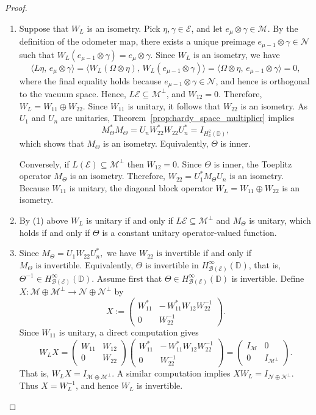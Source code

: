 \documentclass[12pt]{amsart}
\theoremstyle{definition}
\theoremstyle{remark}
\def \D{\mathbb{D}}
\newcommand{\clb}{\mathcal{B}}
\newcommand{\cle}{\mathcal{E}}
\newcommand{\clm}{\mathcal{M}}
\newcommand{\cln}{\mathcal{N}}
\numberwithin{equation}{section}
\begin{document}
\begin{proof}
\begin{enumerate}
        \item 
Suppose that $W_L$ is an isometry. Pick $\eta, \gamma \in \cle$, and let $e_\mu \otimes \gamma \in \clm$. By the definition of the odometer map, there exists a unique preimage $e_{\mu-1} \otimes  \gamma \in \cln$ such that $W_L( e_{\mu-1} \otimes  \gamma)=e_\mu \otimes \gamma$.
Since $W_L$ is an isometry, we have
\[
\langle L\eta,\, e_\mu \otimes \gamma \rangle
=
\langle W_L(\Omega \otimes \eta),\, W_L( e_{\mu-1} \otimes  \gamma) \rangle
= \langle \Omega \otimes \eta,\, e_{\mu-1} \otimes  \gamma \rangle = 0,
\]
where the final equality holds because $e_{\mu-1}\otimes\gamma \in \cln$, and hence is orthogonal to the vacuum space. Hence, $L\cle \subseteq \clm^\perp$, and $W_{12} = 0$. Therefore, $W_L = W_{11} \oplus W_{22}$. Since $W_{11}$ is unitary, it follows that $W_{22}$ is an isometry. As $U_1$ and $U_n$ are unitaries, Theorem~\ref{prop:hardy_space_multiplier} implies
\[
M_{\Theta}^*M_{\Theta}
=
U_n W_{22}^* W_{22} U_n^*
=
I_{H^2_\cle(\D)},
\]
which shows that $M_{\Theta}$ is an isometry. Equivalently, $\Theta$ is inner.

Conversely, if $L(\cle)\subseteq \clm^\perp$ then $W_{12}=0.$ Since $\Theta$ is inner, the Toeplitz operator $M_\Theta$ is an isometry. Therefore, $W_{22}=U_1^*M_\Theta U_n$ is an isometry. Because $W_{11}$ is unitary, the diagonal block operator $W_L = W_{11} \oplus W_{22}$ is an isometry.

\item By (1) above \(W_L\) is unitary if
and only if $L\cle\subseteq\clm^\perp$ and \(M_\Theta\) is unitary, which holds if and only if \(\Theta\) is
a constant unitary operator-valued function.
\item
Since $M_\Theta = U_1 W_{22} U_n^*,$ we have $W_{22}\text{ is invertible}$ if and only if $
M_\Theta\text{ is invertible}.$
Equivalently, \(\Theta\) is invertible in
\(H^\infty_{\clb(\cle)}(\D)\), that is,
\(\Theta^{-1}\in H^\infty_{\clb(\cle)}(\D)\).
Assume first that $\Theta \in H^\infty_{\clb(\cle)}(\D)$ is invertible. Define $X:\clm\oplus \clm^\perp \to \cln\oplus \cln^\perp$ by
\[
X:=
\begin{pmatrix} 
W_{11}^* & -\,W_{11}^*W_{12}W_{22}^{-1}\\
0 & W_{22}^{-1}
\end{pmatrix}.
\]
Since $W_{11}$ is unitary, a direct computation gives
\[
W_LX=
\begin{pmatrix}
W_{11} & W_{12}\\
0 & W_{22}
\end{pmatrix}
\begin{pmatrix}
W_{11}^* & -\,W_{11}^*W_{12}W_{22}^{-1}\\
0 & W_{22}^{-1}
\end{pmatrix}
=
\begin{pmatrix}
I_{\clm} & 0\\
0 & I_{\clm^\perp}
\end{pmatrix}.
\]
That is, $W_LX=I_{\clm\oplus \clm^\perp}$. A similar computation implies $XW_L= I_{\cln\oplus \cln^\perp}.$
Thus $X=W_L^{-1}$, and hence $W_L$ is invertible.



\end{enumerate}
\end{proof}
\end{document}
